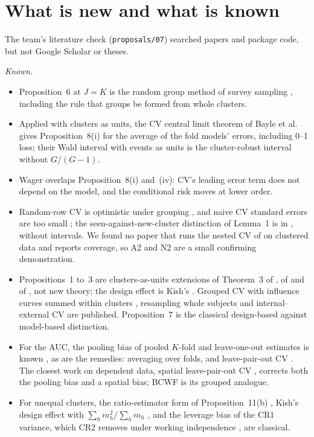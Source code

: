 \documentclass[11pt]{amsart}
\theoremstyle{plain}
\theoremstyle{definition}
\theoremstyle{remark}
\begin{document}
\section{What is new and what is known}\label{sec:new}

The team's literature check (\texttt{proposals/07}) searched papers and package code, but not Google Scholar or theses.

\emph{Known.}
\begin{itemize}
\item Proposition~6 at $J=K$ is the random group method of survey sampling \cite[Chapter~2]{Wolter}, including the rule that groups be formed from whole clusters.
\item Applied with clusters as units, the CV central limit theorem of Bayle et al.~\cite{BBJM} gives Proposition~8(i) for the average of the fold models' errors, including 0--1 loss; their Wald interval with events as units is the cluster-robust interval without $G/(G-1)$.
\item Wager \cite{Wager} overlaps Proposition~8(i) and~(iv): CV's leading error term does not depend on the model, and the conditional risk moves at lower order.
\item Random-row CV is optimistic under grouping \cite{Roberts,Saeb,RR,PM}, and naive CV standard errors are too small \cite{Varoquaux,BG,NB}; the seen-against-new-cluster distinction of Lemma~1 is in \cite{RR}, without intervals. We found no paper that runs the nested CV of \cite{BHT} on clustered data and reports coverage, so A2 and N2 are a small confirming demonstration.
\item Propositions~1 to~3 are clusters-as-units extensions of Theorem~3 of \cite{BHT}, of \cite{BG} and of \cite{BBJM}, not new theory; the design effect is Kish's \cite{Kish}. Grouped CV with influence curves summed within clusters \cite{LeDell}, resampling whole subjects \cite{Cai} and internal--external CV \cite{deJong} are published. Proposition~7 is the classical design-based against model-based distinction.
\item For the AUC, the pooling bias of pooled $K$-fold and leave-one-out estimates is known \cite{Parker,Forman,Airola2010,Airola2011}, as are the remedies: averaging over folds, and leave-pair-out CV \cite{Airola2010,Airola2011,Montoya}. The closest work on dependent data, spatial leave-pair-out CV \cite{Airola2019}, corrects both the pooling bias and a spatial bias; BCWF is its grouped analogue.
\item For unequal clusters, the ratio-estimator form of Proposition~11(b) \cite{Cochran}, Kish's design effect with $\sum_hm_h^2/\sum_hm_h$ \cite{Kish}, and the leverage bias of the CR1 variance, which CR2 removes under working independence \cite{BM,MW}, are classical.
\end{itemize}
\end{document}
